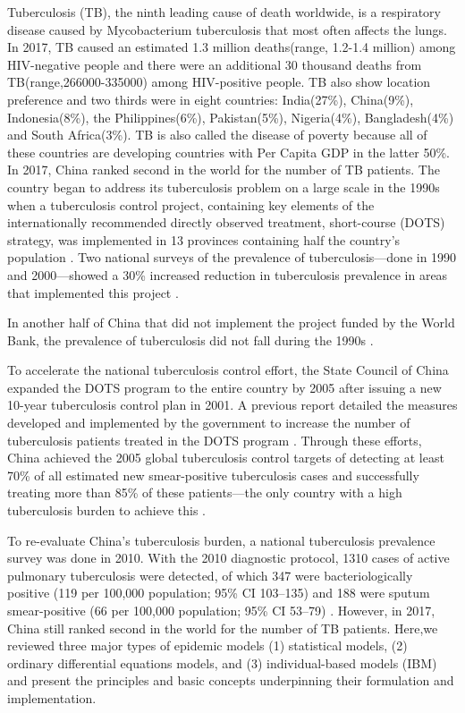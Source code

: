 \documentclass[8pt,twocolumn]{extarticle}
\begin{document}
Tuberculosis (TB), the ninth leading cause of death worldwide, is a respiratory disease caused by Mycobacterium tuberculosis that most often affects the lungs. In 2017, TB caused an estimated 1.3 million deaths(range, 1.2-1.4 million) among HIV-negative people and there were an additional 30 thousand deaths from TB(range,266000-335000) among HIV-positive people. TB also show location preference and two thirds were in eight countries: India(27\%), China(9\%), Indonesia(8\%), the Philippines(6\%), Pakistan(5\%), Nigeria(4\%), Bangladesh(4\%) and South Africa(3\%). \cite{report2018}TB is also called the disease of poverty because all of these countries are developing countries with Per Capita GDP in the latter 50\%. In 2017, China ranked second in the world for the number of TB patients.\cite{report2018}
The country began to address its tuberculosis problem on a large scale in the 1990s when a tuberculosis control project, containing key elements of the internationally recommended directly observed treatment, short-course (DOTS) strategy, was implemented in 13 provinces containing half the country's population \cite{China1996}. Two national surveys of the prevalence of tuberculosis—done in 1990 and 2000—showed a 30\% increased reduction in tuberculosis prevalence in areas that implemented this project \cite{China2004}.

In another half of China that did not implement the project funded by the World Bank, the prevalence of tuberculosis did not fall during the 1990s \cite{China1992}.

To accelerate the national tuberculosis control effort, the State Council of China expanded the DOTS program to the entire country by 2005 after issuing a new 10-year tuberculosis control plan in 2001. A previous report detailed the measures developed and implemented by the government to increase the number of tuberculosis patients treated in the DOTS program \cite{China1992}. Through these efforts, China achieved the 2005 global tuberculosis control targets of detecting at least 70\% of all estimated new smear-positive tuberculosis cases and successfully treating more than 85\% of these patients—the only country with a high tuberculosis burden to achieve this \cite{WHO2011, Global2006}.

To re-evaluate China's tuberculosis burden, a national tuberculosis prevalence survey was done in 2010. With the 2010 diagnostic protocol, 1310 cases of active pulmonary tuberculosis were detected, of which 347 were bacteriologically positive (119 per 100,000 population; 95\% CI 103–135) and 188 were sputum smear-positive (66 per 100,000 population; 95\% CI 53–79) \cite{China2014}. However, in 2017, China still ranked second in the world for the number of TB patients.
Here,we reviewed three major types of epidemic models (1) statistical models, (2) ordinary differential equations models, and (3) individual-based models (IBM) and present the principles and basic concepts underpinning their formulation and implementation.
\end{document}
